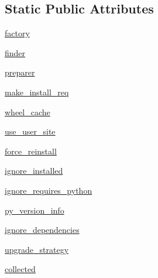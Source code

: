 \subsection*{Static Public Attributes}
\begin{DoxyCompactItemize}
\item 
\hyperlink{classpip_1_1__internal_1_1resolution_1_1resolvelib_1_1resolver_1_1Resolver_ade2b4bb013634d1a3f395bbd50c4652d}{factory}
\item 
\hyperlink{classpip_1_1__internal_1_1resolution_1_1resolvelib_1_1resolver_1_1Resolver_a9745c34391f5f5ccafb130690e20b3fd}{finder}
\item 
\hyperlink{classpip_1_1__internal_1_1resolution_1_1resolvelib_1_1resolver_1_1Resolver_ab566d89f928bf06a8c4b2dad8f5296be}{preparer}
\item 
\hyperlink{classpip_1_1__internal_1_1resolution_1_1resolvelib_1_1resolver_1_1Resolver_a5eaf4f11f085044e9625a7a9c2526d6f}{make\+\_\+install\+\_\+req}
\item 
\hyperlink{classpip_1_1__internal_1_1resolution_1_1resolvelib_1_1resolver_1_1Resolver_a6c9827beea167d25f9a7aab2d5d6e23b}{wheel\+\_\+cache}
\item 
\hyperlink{classpip_1_1__internal_1_1resolution_1_1resolvelib_1_1resolver_1_1Resolver_a966b013564f99d197b5bf8799f0e4d84}{use\+\_\+user\+\_\+site}
\item 
\hyperlink{classpip_1_1__internal_1_1resolution_1_1resolvelib_1_1resolver_1_1Resolver_a98ae1fa0f54067dbbe65ab462cb6522c}{force\+\_\+reinstall}
\item 
\hyperlink{classpip_1_1__internal_1_1resolution_1_1resolvelib_1_1resolver_1_1Resolver_ab53697cebc6e0aca72697ad6588486ee}{ignore\+\_\+installed}
\item 
\hyperlink{classpip_1_1__internal_1_1resolution_1_1resolvelib_1_1resolver_1_1Resolver_a8a1a743b64149ae3eed44605286ced9f}{ignore\+\_\+requires\+\_\+python}
\item 
\hyperlink{classpip_1_1__internal_1_1resolution_1_1resolvelib_1_1resolver_1_1Resolver_ab4c5d434dba38542c8af8854cc5f66df}{py\+\_\+version\+\_\+info}
\item 
\hyperlink{classpip_1_1__internal_1_1resolution_1_1resolvelib_1_1resolver_1_1Resolver_a91d554093f7b1def080c6a91cf7772d1}{ignore\+\_\+dependencies}
\item 
\hyperlink{classpip_1_1__internal_1_1resolution_1_1resolvelib_1_1resolver_1_1Resolver_a5f96ca89dd2817dae1f9cead748c0d5d}{upgrade\+\_\+strategy}
\item 
\hyperlink{classpip_1_1__internal_1_1resolution_1_1resolvelib_1_1resolver_1_1Resolver_ae30dae6a72784433ede7e2dc4b4d7af6}{collected}

\end{DoxyCompactItemize}
